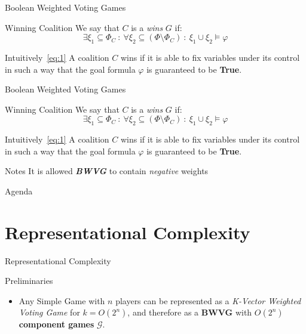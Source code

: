 \documentclass{beamer}
\begin{document}
\begin{frame}[fragile]{Boolean Weighted Voting Games}
  \begin{block}{Winning Coalition}
    We say that $C$ is a \textit{wins} $G$ if:
    \begin{equation}
      \exists \xi_1 \subseteq \Phi_C\ :\ \forall \xi_2 \subseteq (\Phi \setminus \Phi_C)\ :\ \xi_1 \cup \xi_2 \models \varphi \label{eq:1}
    \end{equation}
  \end{block}
  \begin{block}{Intuitively~\ref{eq:1}}
    A coalition $C$ wins if it is able to fix variables under its control in such a way that the goal formula $\varphi$ is guaranteed to be \textbf{True}.
  \end{block}
\end{frame}

\begin{frame}[fragile]{Boolean Weighted Voting Games}
  \begin{block}{Winning Coalition}
    We say that $C$ is a \textit{wins} $G$ if:
    \begin{equation}
      \exists \xi_1 \subseteq \Phi_C\ :\ \forall \xi_2 \subseteq (\Phi \setminus \Phi_C)\ :\ \xi_1 \cup \xi_2 \models \varphi \label{eq:1}
    \end{equation}
  \end{block}
  \begin{block}{Intuitively~\ref{eq:1}}
    A coalition $C$ wins if it is able to fix variables under its control in such a way that the goal formula $\varphi$ is guaranteed to be \textbf{True}.
  \end{block}
  \begin{block}{Notes}
    It is allowed \textbf{\textit{BWVG}} to contain \textit{negative} weights
  \end{block}
\end{frame}

\begin{frame}[fragile]{Agenda}
  \section{Representational Complexity}
  \tableofcontents[currentsection]
\end{frame}

\begin{frame}[fragile]{Representational Complexity}
  \begin{block}{Preliminaries}
    \begin{itemize}
      \item Any Simple Game with $n$ players can be represented as a \textit{K-Vector Weighted Voting Game}
      for $k = O(2^n)$, and therefore as a \textbf{BWVG} with $O(2^n)$ \textbf{component games} $\mathcal{G}$.
    \end{itemize}
  \end{block}
\end{frame}
\end{document}
